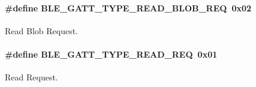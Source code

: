 \paragraph[{\texorpdfstring{B\+L\+E\+\_\+\+G\+A\+T\+T\+\_\+\+T\+Y\+P\+E\+\_\+\+R\+E\+A\+D\+\_\+\+B\+L\+O\+B\+\_\+\+R\+EQ}{BLE_GATT_TYPE_READ_BLOB_REQ}}]{\setlength{\rightskip}{0pt plus 5cm}\#define B\+L\+E\+\_\+\+G\+A\+T\+T\+\_\+\+T\+Y\+P\+E\+\_\+\+R\+E\+A\+D\+\_\+\+B\+L\+O\+B\+\_\+\+R\+EQ~0x02}\hypertarget{group___b_l_e___g_a_t_t___r_e_a_d___t_y_p_e_s_ga3fe5504aa9c3d4daab080686717a688e}{}\label{group___b_l_e___g_a_t_t___r_e_a_d___t_y_p_e_s_ga3fe5504aa9c3d4daab080686717a688e}
Read Blob Request. 
\paragraph[{\texorpdfstring{B\+L\+E\+\_\+\+G\+A\+T\+T\+\_\+\+T\+Y\+P\+E\+\_\+\+R\+E\+A\+D\+\_\+\+R\+EQ}{BLE_GATT_TYPE_READ_REQ}}]{\setlength{\rightskip}{0pt plus 5cm}\#define B\+L\+E\+\_\+\+G\+A\+T\+T\+\_\+\+T\+Y\+P\+E\+\_\+\+R\+E\+A\+D\+\_\+\+R\+EQ~0x01}\hypertarget{group___b_l_e___g_a_t_t___r_e_a_d___t_y_p_e_s_gac806fd79e32c2a88a5b5e3d34a03623b}{}\label{group___b_l_e___g_a_t_t___r_e_a_d___t_y_p_e_s_gac806fd79e32c2a88a5b5e3d34a03623b}
Read Request. 